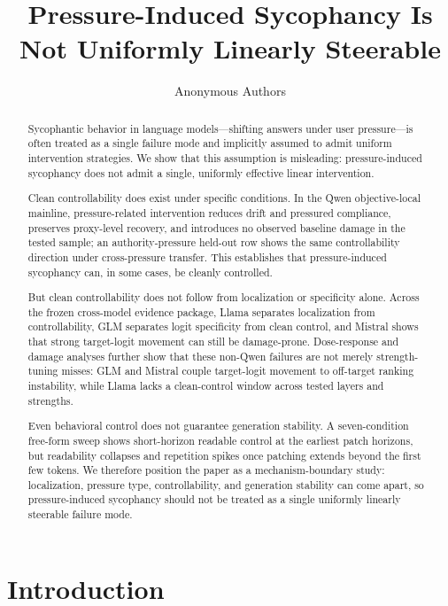 \documentclass[11pt]{article}
\title{Pressure-Induced Sycophancy Is Not Uniformly Linearly Steerable}
\author{Anonymous Authors}
\date{}
\begin{document}
\maketitle

\begin{abstract}
Sycophantic behavior in language models---shifting answers under user pressure---is often treated as a single failure mode and implicitly assumed to admit uniform intervention strategies.
We show that this assumption is misleading: pressure-induced sycophancy does not admit a single, uniformly effective linear intervention.

Clean controllability does exist under specific conditions.
In the Qwen objective-local mainline, pressure-related intervention reduces drift and pressured compliance, preserves proxy-level recovery, and introduces no observed baseline damage in the tested sample; an authority-pressure held-out row shows the same controllability direction under cross-pressure transfer.
This establishes that pressure-induced sycophancy can, in some cases, be cleanly controlled.

But clean controllability does not follow from localization or specificity alone.
Across the frozen cross-model evidence package, Llama separates localization from controllability, GLM separates logit specificity from clean control, and Mistral shows that strong target-logit movement can still be damage-prone.
Dose-response and damage analyses further show that these non-Qwen failures are not merely strength-tuning misses: GLM and Mistral couple target-logit movement to off-target ranking instability, while Llama lacks a clean-control window across tested layers and strengths.

Even behavioral control does not guarantee generation stability.
A seven-condition free-form sweep shows short-horizon readable control at the earliest patch horizons, but readability collapses and repetition spikes once patching extends beyond the first few tokens.
We therefore position the paper as a mechanism-boundary study: localization, pressure type, controllability, and generation stability can come apart, so pressure-induced sycophancy should not be treated as a single uniformly linearly steerable failure mode.
\end{abstract}

\section{Introduction}
\end{document}
